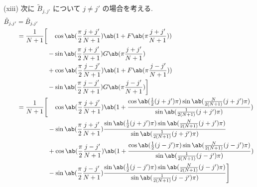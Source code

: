 \documentclass[uplatex,diffipdfmx,a4paper,11pt]{jlreq}
\theoremstyle{definition}
\begin{document}
(xiii) 次に $\tilde{B}_{j,j'}$ について $j \neq j'$ の場合を考える.
\begin{align}
  \tilde{B}_{j,j'} & = \tilde{B}_{j,j'}                                                                                                                                                                      \\
                   & \ \begin{aligned}
                         = \frac{1}{N+1}\bigg[ & \quad\cos\ab(\frac{\pi}{2}\frac{j + j'}{N+1})\ab(1 + F\ab(\pi\frac{j + j'}{N+1})) \\
                                               & - \sin\ab(\frac{\pi}{2}\frac{j + j'}{N+1})G\ab(\pi\frac{j + j'}{N+1})             \\
                                               & + \cos\ab(\frac{\pi}{2}\frac{j - j'}{N+1})\ab(1 + F\ab(\pi\frac{j - j'}{N+1}))    \\
                                               & - \sin\ab(\frac{\pi}{2}\frac{j - j'}{N+1})G\ab(\pi\frac{j - j'}{N+1})\bigg]
                       \end{aligned}                                                                                             \\
                   & \ \begin{aligned}
                         = \frac{1}{N+1}\Bigg[ & \quad\cos\ab(\frac{\pi}{2}\frac{j + j'}{N+1})\ab(1 + \frac{\cos\ab(\frac{1}{2}(j+j')\pi)\sin\ab(\frac{N}{2(N+1)}(j+j')\pi)}{\sin\ab(\frac{1}{2(N+1)}(j+j')\pi)}) \\
                                               & - \sin\ab(\frac{\pi}{2}\frac{j + j'}{N+1})\frac{\sin\ab(\frac{1}{2}(j+j')\pi)\sin\ab(\frac{N}{2(N+1)}(j+j')\pi)}{\sin\ab(\frac{1}{2(N+1)}(j+j')\pi)}             \\
                                               & + \cos\ab(\frac{\pi}{2}\frac{j - j'}{N+1})\ab(1 + \frac{\cos\ab(\frac{1}{2}(j-j')\pi)\sin\ab(\frac{N}{2(N+1)}(j-j')\pi)}{\sin\ab(\frac{1}{2(N+1)}(j-j')\pi)})    \\
                                               & - \sin\ab(\frac{\pi}{2}\frac{j - j'}{N+1})\frac{\sin\ab(\frac{1}{2}(j-j')\pi)\sin\ab(\frac{N}{2(N+1)}(j-j')\pi)}{\sin\ab(\frac{1}{2(N+1)}(j-j')\pi)}\Bigg]
                       \end{aligned}                                                                                              \\
                   & \ \begin{aligned}

\end{aligned}
\end{align}
\end{document}

